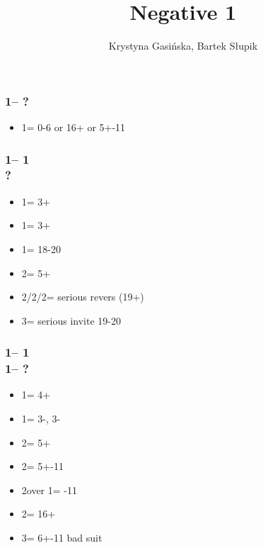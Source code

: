 \documentclass[12pt, a4paper]{article}
\title{Negative 1\diams}
\author{Krystyna Gasińska, Bartek Słupik}
\begin{document}
\maketitle


\subsubsection*{1\clubs -- ?}
\begin{itemize}
    \item 1\diams = 0-6 or 16+ \bal or 5+-11
\end{itemize}

\subsubsection*{1\clubs -- 1\diams\\
                ?}
\begin{itemize}
    \item 1\hearts = 3+
    \item 1\spades = 3+
    \item 1\nt = 18-20 \bal
    \item 2\clubs = 5+\clubs
    \item 2\diams/2\hearts/2\spades = serious revers (19+)
    \item 3\clubs = serious invite 19-20
\end{itemize}

\subsubsection*{1\clubs -- 1\diams\\
                1\major -- ?}
\begin{itemize}
    \item 1\spades = 4+\spades
    \item 1\nt = 3-\hearts, 3-\spades
    \item 2\clubs = 5+\clubs
    \item 2\diams = 5+-11
    \item 2\spades over 1\hearts = -11
    \item 2\nt = 16+ \bal
    \item 3\minor = 6+-11 bad suit
\end{itemize}

\end{document}
